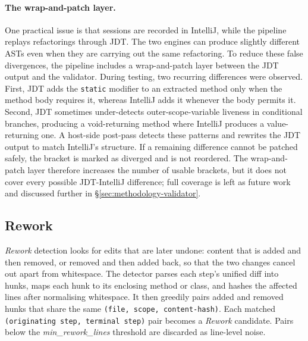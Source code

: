 \paragraph{The wrap-and-patch layer.}
One practical issue is that sessions are recorded in IntelliJ, while the pipeline replays refactorings through JDT. The two engines can produce slightly different ASTs even when they are carrying out the same refactoring. To reduce these false divergences, the pipeline includes a wrap-and-patch layer between the JDT output and the validator. During testing, two recurring differences were observed. First, JDT adds the \texttt{static} modifier to an extracted method only when the method body requires it, whereas IntelliJ adds it whenever the body permits it. Second, JDT sometimes under-detects outer-scope-variable liveness in conditional branches, producing a void-returning method where IntelliJ produces a value-returning one. A host-side post-pass detects these patterns and rewrites the JDT output to match IntelliJ's structure. If a remaining difference cannot be patched safely, the bracket is marked as diverged and is not reordered. The wrap-and-patch layer therefore increases the number of usable brackets, but it does not cover every possible JDT-IntelliJ difference; full coverage is left as future work and discussed further in \S\ref{sec:methodology-validator}.

\subsection{Rework}
\label{sec:methodology-detector-rework}
\label{sec:methodology-reworksynth}

\emph{Rework} detection looks for edits that are later undone: content that is added and then removed, or removed and then added back, so that the two changes cancel out apart from whitespace. The detector parses each step's unified diff into hunks, maps each hunk to its enclosing method or class, and hashes the affected lines after normalising whitespace. It then greedily pairs added and removed hunks that share the same \texttt{(file, scope, content-hash)}. Each matched \texttt{(originating step, terminal step)} pair becomes a \emph{Rework} candidate. Pairs below the \emph{min\_rework\_lines} threshold are discarded as line-level noise.

